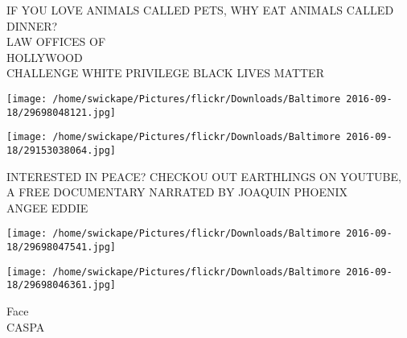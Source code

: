 \documentclass[10pt,letterpaper]{article}
\begin{document}
IF YOU LOVE ANIMALS CALLED PETS, WHY EAT ANIMALS CALLED DINNER?\\
LAW OFFICES OF\\
HOLLYWOOD\\
CHALLENGE WHITE PRIVILEGE BLACK LIVES MATTER\\
\pagebreak

\texttt{[image: /home/swickape/Pictures/flickr/Downloads/Baltimore 2016-09-18/29698048121.jpg]}

\vspace{0.25in}
\texttt{[image: /home/swickape/Pictures/flickr/Downloads/Baltimore 2016-09-18/29153038064.jpg]}

INTERESTED IN PEACE?  CHECKOU OUT EARTHLINGS ON YOUTUBE, A FREE DOCUMENTARY NARRATED BY JOAQUIN PHOENIX\\
ANGEE EDDIE\\
\pagebreak

\texttt{[image: /home/swickape/Pictures/flickr/Downloads/Baltimore 2016-09-18/29698047541.jpg]}

\vspace{0.25in}
\texttt{[image: /home/swickape/Pictures/flickr/Downloads/Baltimore 2016-09-18/29698046361.jpg]}

Face\\
CASPA\\
\pagebreak
\end{document}
